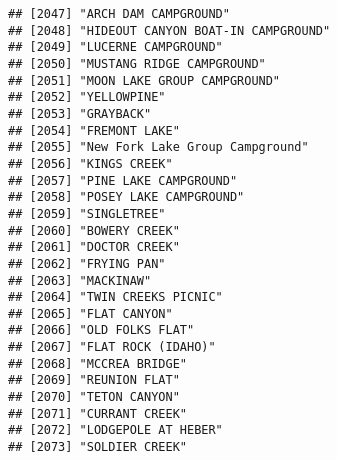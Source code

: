 \documentclass[
]{article}
\begin{document}
\begin{verbatim}
## [2047] "ARCH DAM CAMPGROUND"                                                                 
## [2048] "HIDEOUT CANYON BOAT-IN CAMPGROUND"                                                   
## [2049] "LUCERNE CAMPGROUND"                                                                  
## [2050] "MUSTANG RIDGE CAMPGROUND"                                                            
## [2051] "MOON LAKE GROUP CAMPGROUND"                                                          
## [2052] "YELLOWPINE"                                                                          
## [2053] "GRAYBACK"                                                                            
## [2054] "FREMONT LAKE"                                                                        
## [2055] "New Fork Lake Group Campground"                                                      
## [2056] "KINGS CREEK"                                                                         
## [2057] "PINE LAKE CAMPGROUND"                                                                
## [2058] "POSEY LAKE CAMPGROUND"                                                               
## [2059] "SINGLETREE"                                                                          
## [2060] "BOWERY CREEK"                                                                        
## [2061] "DOCTOR CREEK"                                                                        
## [2062] "FRYING PAN"                                                                          
## [2063] "MACKINAW"                                                                            
## [2064] "TWIN CREEKS PICNIC"                                                                  
## [2065] "FLAT CANYON"                                                                         
## [2066] "OLD FOLKS FLAT"                                                                      
## [2067] "FLAT ROCK (IDAHO)"                                                                   
## [2068] "MCCREA BRIDGE"                                                                       
## [2069] "REUNION FLAT"                                                                        
## [2070] "TETON CANYON"                                                                        
## [2071] "CURRANT CREEK"                                                                       
## [2072] "LODGEPOLE AT HEBER"                                                                  
## [2073] "SOLDIER CREEK"                                                                       

\end{verbatim}
\end{document}
